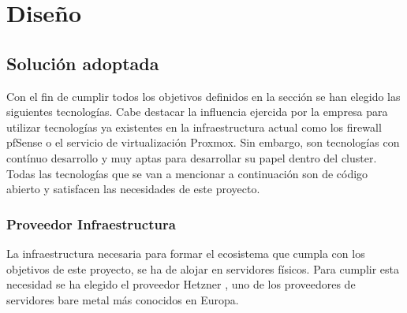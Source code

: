 \chapter {Diseño}

\section{Solución adoptada}
	\begin{paragraph}
		Con el fin de cumplir todos los objetivos definidos en la sección  se han elegido las siguientes tecnologías. Cabe destacar la influencia ejercida por la empresa para utilizar tecnologías ya existentes en la infraestructura actual como los firewall pfSense o el servicio de virtualización Proxmox. Sin embargo, son tecnologías con contínuo desarrollo y muy aptas para desarrollar su papel dentro del cluster. \\
		Todas las tecnologías que se van a mencionar a continuación son de código abierto y satisfacen las necesidades de este proyecto. 
	\end{paragraph}

	\subsection{Proveedor Infraestructura}
		\begin{paragraph}
			La infraestructura necesaria para formar el ecosistema que cumpla con los objetivos de este proyecto, se ha de alojar en servidores físicos. Para cumplir esta necesidad se ha elegido el proveedor Hetzner \cite{hetzner:online}, uno de los proveedores de servidores bare metal más conocidos en Europa. \\
		\end{paragraph}
		 \clearpage
